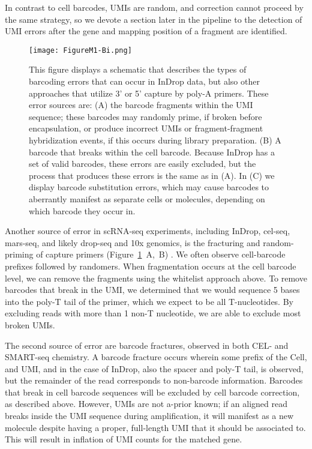 In contrast to cell barcodes, UMIs are random, and correction cannot proceed by the same strategy, so we devote a section later in the pipeline to the detection of UMI errors after the gene and mapping position of a fragment are identified.

\begin{figure}
\centering
\texttt{[image: FigureM1-Bi.png]}
\caption{This figure displays a schematic that describes the types of barcoding errors that can occur in InDrop data, but also other approaches that utilize 3' or 5' capture by poly-A primers. These error sources are: (A) the barcode fragments within the UMI sequence; these barcodes may randomly prime, if broken before encapsulation, or produce incorrect UMIs or fragment-fragment hybridization events, if this occurs during library preparation. (B) A barcode that breaks within the cell barcode. Because InDrop has a set of valid barcodes, these errors are easily excluded, but the process that produces these errors is the same as in (A). In (C) we display barcode substitution errors, which may cause barcodes to aberrantly manifest as separate cells or molecules, depending on which barcode they occur in.}
\label{fig:m1bi}
\end{figure}

Another source of error in scRNA-seq experiments, including InDrop, cel-seq, mars-seq, and likely drop-seq and 10x genomics, is the fracturing and random-priming of capture primers (Figure~\ref{fig:m1bi}~A,~B) \citep{Jaitin2014}. 
We often observe cell-barcode prefixes followed by randomers. 
When fragmentation occurs at the cell barcode level, we can remove the fragments using the whitelist approach above. To remove barcodes that break in the UMI, we determined that we would sequence 5 bases into the poly-T tail of the primer, which we expect to be all T-nucleotides. 
By excluding reads with more than 1 non-T nucleotide, we are able to exclude most broken UMIs.

The second source of error are barcode fractures, observed in both CEL- and SMART-seq chemistry. %
A barcode fracture occurs wherein some prefix of the Cell, and UMI, and in the case of InDrop, also the spacer and poly-T tail, is observed, but the remainder of the read corresponds to non-barcode information. 
Barcodes that break in cell barcode sequences will be excluded by cell barcode correction, as described above. 
However, UMIs are not a-prior known; if an aligned read breaks inside the UMI sequence during amplification, it will manifest as a new molecule despite having a proper, full-length UMI that it should be associated to.
This will result in inflation of UMI counts for the matched gene. 

